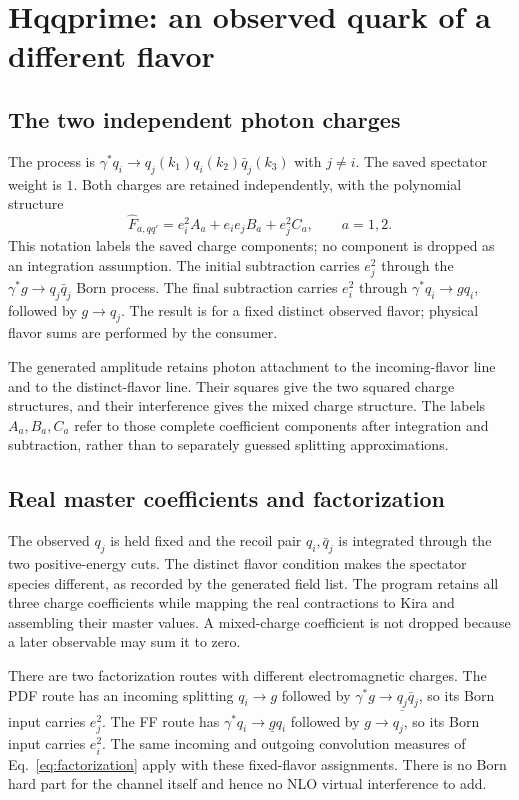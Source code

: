 \documentclass[11pt,a4paper]{article}
\newcommand{\Fhat}{\widehat F}
\newcommand{\obs}[1]{\underline{#1}}
\begin{document}
\section{Hqqprime: an observed quark of a different flavor}
\label{sec:hqqprime}

\subsection{The two independent photon charges}

The process is $\gamma^*q_i\to q_j(k_1)q_i(k_2)\bar q_j(k_3)$ with
$j\ne i$. The saved spectator weight is $1$. Both charges are retained
independently, with the polynomial structure
\begin{equation}
 \Fhat_{a,qq'}=e_i^2 A_a+e_i e_j B_a+e_j^2 C_a,\qquad a=1,2.
\end{equation}
This notation labels the saved charge components; no component is dropped
as an integration assumption. The initial subtraction carries $e_j^2$
through the $\gamma^*g\to q_j\bar q_j$ Born process. The final subtraction
carries $e_i^2$ through $\gamma^*q_i\to gq_i$, followed by $g\to q_j$.
The result is for a fixed distinct observed flavor; physical flavor sums
are performed by the consumer.

The generated amplitude retains photon attachment to the incoming-flavor
line and to the distinct-flavor line. Their squares give the two squared
charge structures, and their interference gives the mixed charge
structure. The labels $A_a,B_a,C_a$ refer to those complete coefficient
components after integration and subtraction, rather than to separately
guessed splitting approximations.

\subsection{Real master coefficients and factorization}

The observed $q_j$ is held fixed and the recoil pair $q_i,\bar q_j$
is integrated through the two positive-energy cuts. The distinct flavor
condition makes the spectator species different, as recorded by the
generated field list. The program retains all three charge coefficients
while mapping the real contractions to Kira and assembling their master
values. A mixed-charge coefficient is not dropped because a later
observable may sum it to zero.

There are two factorization routes with different electromagnetic
charges. The PDF route has an incoming splitting $q_i\to g$ followed
by $\gamma^*g\to\obs{q_j}\bar q_j$, so its Born input carries
$e_j^2$. The FF route has $\gamma^*q_i\to\obs{g}q_i$ followed
by $g\to q_j$, so its Born input carries $e_i^2$. The same incoming
and outgoing convolution measures of Eq.~\eqref{eq:factorization}
apply with these fixed-flavor assignments. There is no Born hard part
for the channel itself and hence no NLO virtual interference to add.
\end{document}
